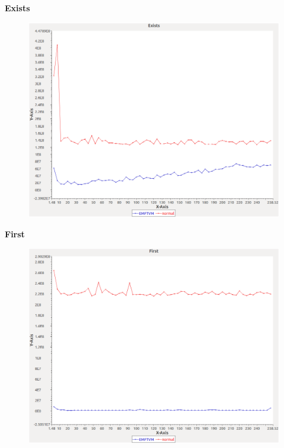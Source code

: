 \noindent\textbf{Exists}

\begin{figure}[h]
\centering
\includegraphics[width=\textwidth]{../graphs/sequence/Exists}
\end{figure}
\pagebreak

\noindent\textbf{First}

\begin{figure}[h]
\centering
\includegraphics[width=\textwidth]{../graphs/sequence/First}
\end{figure}
\pagebreak

